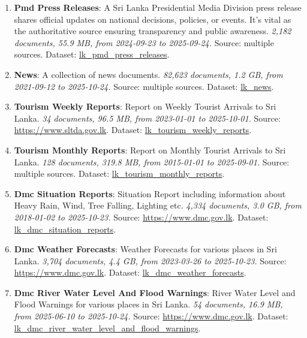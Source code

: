 \documentclass[10pt,a4paper]{article}%
\begin{document}
\begin{enumerate}
\item%
\textbf{Pmd Press Releases}: A Sri Lanka Presidential Media Division press release shares official updates on national decisions, policies, or events. It’s vital as the authoritative source ensuring transparency and public awareness.\textit{ 2,182 documents, 55.9 MB, from 2024{-}09{-}23 to 2025{-}09{-}24.} Source: multiple sources. Dataset: \href{https://github.com/nuuuwan/lk\_pmd/tree/data\_lk\_pmd\_press\_releases/data/lk\_pmd\_press\_releases}{lk\_pmd\_press\_releases}.%
\item%
\textbf{News}: A collection of news documents.\textit{ 82,623 documents, 1.2 GB, from 2021{-}09{-}12 to 2025{-}10{-}24.} Source: multiple sources. Dataset: \href{https://github.com/nuuuwan/lk\_news/tree/data/data/lk\_news}{lk\_news}.%
\item%
\textbf{Tourism Weekly Reports}: Report on Weekly Tourist Arrivals to Sri Lanka.\textit{ 34 documents, 96.5 MB, from 2023{-}01{-}01 to 2025{-}10{-}01.} Source: \href{https://www.sltda.gov.lk}{https://www.sltda.gov.lk}. Dataset: \href{https://github.com/nuuuwan/lk\_tourism/tree/data\_lk\_tourism\_weekly\_reports/data/lk\_tourism\_weekly\_reports}{lk\_tourism\_weekly\_reports}.%
\item%
\textbf{Tourism Monthly Reports}: Report on Monthly Tourist Arrivals to Sri Lanka.\textit{ 128 documents, 319.8 MB, from 2015{-}01{-}01 to 2025{-}09{-}01.} Source: multiple sources. Dataset: \href{https://github.com/nuuuwan/lk\_tourism/tree/data\_lk\_tourism\_monthly\_reports/data/lk\_tourism\_monthly\_reports}{lk\_tourism\_monthly\_reports}.%
\item%
\textbf{Dmc Situation Reports}: Situation Report including information about Heavy Rain, Wind, Tree Falling, Lighting etc.\textit{ 4,334 documents, 3.0 GB, from 2018{-}01{-}02 to 2025{-}10{-}23.} Source: \href{https://www.dmc.gov.lk}{https://www.dmc.gov.lk}. Dataset: \href{https://github.com/nuuuwan/lk\_dmc/tree/data\_lk\_dmc\_situation\_reports/data/lk\_dmc\_situation\_reports}{lk\_dmc\_situation\_reports}.%
\item%
\textbf{Dmc Weather Forecasts}: Weather Forecasts for various places in Sri Lanka.\textit{ 3,704 documents, 4.4 GB, from 2023{-}03{-}26 to 2025{-}10{-}23.} Source: \href{https://www.dmc.gov.lk}{https://www.dmc.gov.lk}. Dataset: \href{https://github.com/nuuuwan/lk\_dmc/tree/data\_lk\_dmc\_weather\_forecasts/data/lk\_dmc\_weather\_forecasts}{lk\_dmc\_weather\_forecasts}.%
\item%
\textbf{Dmc River Water Level And Flood Warnings}: River Water Level and Flood Warnings for various places in Sri Lanka.\textit{ 54 documents, 16.9 MB, from 2025{-}06{-}10 to 2025{-}10{-}24.} Source: \href{https://www.dmc.gov.lk}{https://www.dmc.gov.lk}. Dataset: \href{https://github.com/nuuuwan/lk\_dmc/tree/data\_lk\_dmc\_river\_water\_level\_and\_flood\_warnings/data/lk\_dmc\_river\_water\_level\_and\_flood\_warnings}{lk\_dmc\_river\_water\_level\_and\_flood\_warnings}.%

\end{enumerate}
\end{document}
